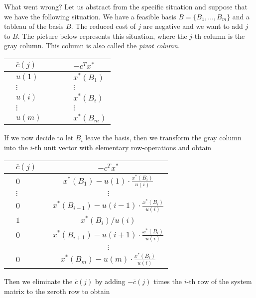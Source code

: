 What went wrong? Let us abstract from the specific situation and
suppose that we have the following situation. We have a feasible basis
$B = \{B_1,\ldots,B_m\}$ and a tableau  of the basis $B$. The reduced cost
of $j$ are negative and we want to add $j$ to $B$. The picture below
represents this situation, where the $j$-th column is the gray
column. This column is also called the \emph{pivot column}. 

\begin{center}
  \begin{tabularx}{0.5\textwidth}{ABAAA|X}   
        & $\overline{c}(j)$ & &  & & $-c^Tx^*$ \\\hline
       &$ u(1)$  & & & & $x^*(B_1)$  \\
       &$\vdots$  & & & & $\vdots$  \\
       &$ u(i)$  & & & & $x^*(B_i)$  \\
       &$\vdots$  & & & & $\vdots$  \\
       &$ u(m)$  & & & & $x^*(B_m)$  \\
 \end{tabularx}
\end{center}
%
If we now decide to let $B_i$ leave the basis, then we transform the
gray column into the $i$-th unit vector with elementary row-operations
and obtain 

\begin{center}
  \begin{tabular}{cGc|c}   
        \hspace{2cm} &  $\overline{c}(j)$
     &\hspace{2cm}  & 

$-c^Tx^*$ \\ \hline
&       $ 0 $  &&   $x^*(B_1) -  u(1) \cdot \frac{x^*(B_i)}{u(i)} $  \\
&       $ \vdots $ && $\vdots$  \\
&       $ 0 $  && $x^*(B_{i-1})- u(i-1) \cdot \frac{x^*(B_i)}{ u(i)}    $  \\
&       $ 1$  && $x^*(B_i) / u(i)$  \\
&       $ 0 $  &&  $x^*(B_{i+1})-   u(i+1)\cdot  \frac{x^*(B_i)}{ u(i)}  $  \\
&       $ $  && $\vdots$  \\
&       $ 0 $  &&   $x^*(B_m) - u(m) \cdot \frac{x^*(B_i)}{u(i)}$  
 \end{tabular}
\end{center}

Then we eliminate the $\overline{c}(j)$ by adding $-\overline{c}(j)$
times the $i$-th row of the system matrix to the zeroth row to obtain 



